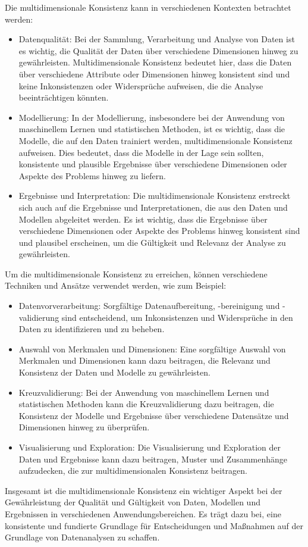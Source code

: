 \documentclass[../vs-script-first-v01.tex]{subfiles}
\begin{document}
Die multidimensionale Konsistenz kann in verschiedenen Kontexten betrachtet werden:
\begin{itemize}
\item Datenqualität: Bei der Sammlung, Verarbeitung und Analyse von Daten ist es wichtig, die Qualität der Daten über verschiedene Dimensionen hinweg zu gewährleisten. Multidimensionale Konsistenz bedeutet hier, dass die Daten über verschiedene Attribute oder Dimensionen hinweg konsistent sind und keine Inkonsistenzen oder Widersprüche aufweisen, die die Analyse beeinträchtigen könnten.

\item Modellierung: In der Modellierung, insbesondere bei der Anwendung von maschinellem Lernen und statistischen Methoden, ist es wichtig, dass die Modelle, die auf den Daten trainiert werden, multidimensionale Konsistenz aufweisen. Dies bedeutet, dass die Modelle in der Lage sein sollten, konsistente und plausible Ergebnisse über verschiedene Dimensionen oder Aspekte des Problems hinweg zu liefern.

\item Ergebnisse und Interpretation: Die multidimensionale Konsistenz erstreckt sich auch auf die Ergebnisse und Interpretationen, die aus den Daten und Modellen abgeleitet werden. Es ist wichtig, dass die Ergebnisse über verschiedene Dimensionen oder Aspekte des Problems hinweg konsistent sind und plausibel erscheinen, um die Gültigkeit und Relevanz der Analyse zu gewährleisten.
\end{itemize}
Um die multidimensionale Konsistenz zu erreichen, können verschiedene Techniken und Ansätze verwendet werden, wie zum Beispiel:
\begin{itemize}
\item Datenvorverarbeitung: Sorgfältige Datenaufbereitung, -bereinigung und -validierung sind entscheidend, um Inkonsistenzen und Widersprüche in den Daten zu identifizieren und zu beheben.
\item Auswahl von Merkmalen und Dimensionen: Eine sorgfältige Auswahl von Merkmalen und Dimensionen kann dazu beitragen, die Relevanz und Konsistenz der Daten und Modelle zu gewährleisten.
\item Kreuzvalidierung: Bei der Anwendung von maschinellem Lernen und statistischen Methoden kann die Kreuzvalidierung dazu beitragen, die Konsistenz der Modelle und Ergebnisse über verschiedene Datensätze und Dimensionen hinweg zu überprüfen.
\item Visualisierung und Exploration: Die Visualisierung und Exploration der Daten und Ergebnisse kann dazu beitragen, Muster und Zusammenhänge aufzudecken, die zur multidimensionalen Konsistenz beitragen.
\end{itemize}
Insgesamt ist die multidimensionale Konsistenz ein wichtiger Aspekt bei der Gewährleistung der Qualität und Gültigkeit von Daten, Modellen und Ergebnissen in verschiedenen Anwendungsbereichen. Es trägt dazu bei, eine konsistente und fundierte Grundlage für Entscheidungen und Maßnahmen auf der Grundlage von Datenanalysen zu schaffen.
\end{document}
